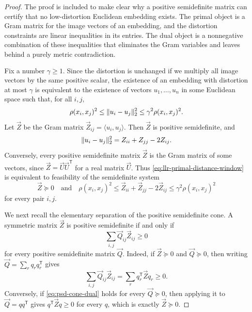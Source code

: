 \begin{proof}
	The proof is included to make clear why a positive semidefinite matrix can certify that no low-distortion Euclidean embedding exists. The primal object is a Gram matrix for the image vectors of an embedding, and the distortion constraints are linear inequalities in its entries. The dual object is a nonnegative combination of these inequalities that eliminates the Gram variables and leaves behind a purely metric contradiction.

	Fix a number \(\gamma\geq 1\). Since the distortion is unchanged if we multiply all image vectors by the same positive scalar, the existence of an embedding with distortion at most \(\gamma\) is equivalent to the existence of vectors \(u_1,\ldots,u_n\) in some Euclidean space such that, for all \(i,j\),
	\begin{equation}
		\label{eq:llr-primal-distance-window}
		\rho(x_i,x_j)^2\leq \lVert u_i-u_j\rVert_2^2\leq \gamma^2\rho(x_i,x_j)^2.
	\end{equation}
	Let \(\vec{Z}\) be the Gram matrix \(\vec{Z}_{ij}=\langle u_i,u_j\rangle\). Then \(\vec{Z}\) is positive semidefinite, and
	\begin{equation}
		\label{eq:llr-gram-distance-expression}
		\lVert u_i-u_j\rVert_2^2=Z_{ii}+Z_{jj}-2Z_{ij}.
	\end{equation}
	Conversely, every positive semidefinite matrix \(\vec{Z}\) is the Gram matrix of some vectors, since \(\vec{Z}=\vec{U}\vec{U}^{\mathsf{T}}\) for a real matrix \(\vec{U}\). Thus \cref{eq:llr-primal-distance-window} is equivalent to feasibility of the semidefinite system
	\begin{equation}
		\label{eq:llr-primal-sdp}
		\vec{Z}\succeq 0
		\quad\text{and}\quad
		\rho(x_i,x_j)^2\leq \vec{Z}_{ii}+\vec{Z}_{jj}-2\vec{Z}_{ij}\leq \gamma^2\rho(x_i,x_j)^2
	\end{equation}
	for every pair \(i,j\).

	We next recall the elementary separation of the positive semidefinite cone. A symmetric matrix \(\vec{Z}\) is positive semidefinite if and only if
	\begin{equation}
		\label{eq:psd-cone-dual}
		\sum_{i,j}\vec{Q}_{ij}\vec{Z}_{ij}\geq 0
	\end{equation}
	for every positive semidefinite matrix \(\vec{Q}\). Indeed, if \(\vec{Z}\succeq 0\) and \(\vec{Q}\succeq 0\), then writing \(\vec{Q}=\sum_r q_rq_r^{\mathsf{T}}\) gives
	\begin{equation}
		\label{eq:psd-cone-forward}
		\sum_{i,j}\vec{Q}_{ij}\vec{Z}_{ij}=\sum_r q_r^{\mathsf{T}}\vec{Z}q_r\geq 0.
	\end{equation}
	Conversely, if \cref{eq:psd-cone-dual} holds for every \(\vec{Q}\succeq 0\), then applying it to \(\vec{Q}=qq^{\mathsf{T}}\) gives \(q^{\mathsf{T}}\vec{Z}q\geq 0\) for every \(q\), which is exactly \(\vec{Z}\succeq 0\).


\end{proof}
